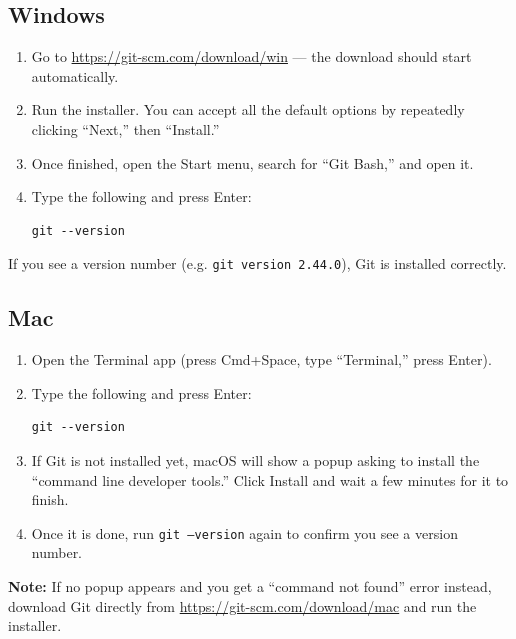 \documentclass[11pt]{article}
\begin{document}
	\subsection*{Windows}
	\begin{enumerate}
		\item Go to \url{https://git-scm.com/download/win} --- the download should start automatically.
		\item Run the installer. You can accept all the default options by repeatedly clicking ``Next,'' then ``Install.''
		\item Once finished, open the Start menu, search for ``Git Bash,'' and open it.
		\item Type the following and press Enter:
\begin{lstlisting}
git --version
\end{lstlisting}
	\end{enumerate}
	If you see a version number (e.g. \texttt{git version 2.44.0}), Git is installed correctly.
	
	\subsection*{Mac}
	\begin{enumerate}
		\item Open the Terminal app (press Cmd+Space, type ``Terminal,'' press Enter).
		\item Type the following and press Enter:
\begin{lstlisting}
git --version
\end{lstlisting}
		\item If Git is not installed yet, macOS will show a popup asking to install the ``command line developer tools.'' Click Install and wait a few minutes for it to finish.
		\item Once it is done, run \texttt{git --version} again to confirm you see a version number.
	\end{enumerate}
	
	\begin{noteBox}
		\textbf{Note:} If no popup appears and you get a ``command not found'' error instead, download Git directly from \url{https://git-scm.com/download/mac} and run the installer.
	\end{noteBox}
	
\end{document}
